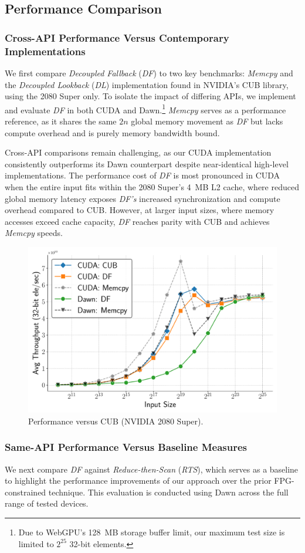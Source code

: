 \documentclass[acmsmall, manuscript, screen, review, anonymous]{acmart}
\begin{document}
\subsection{Performance Comparison}
\subsubsection{Cross-API Performance Versus Contemporary Implementations}
We first compare \emph{Decoupled Fallback} (\emph{DF}) to two key benchmarks: \emph{Memcpy}\textdagger{~\ref{sec:memcpy}} and the \emph{Decoupled Lookback} (\emph{DL}) implementation found in NVIDIA's CUB library, using the 2080 Super only. To isolate the impact of differing APIs, we implement and evaluate \emph{DF} in both CUDA and Dawn.\footnote{Due to WebGPU's 128~MB storage buffer limit, our maximum test size is limited to $2^{25}$ 32-bit elements.} \emph{Memcpy} serves as a performance reference, as it shares the same $2n$ global memory movement as \emph{DF} but lacks compute overhead and is purely memory bandwidth bound.

Cross-API comparisons remain challenging, as our CUDA implementation consistently outperforms its Dawn counterpart despite near-identical high-level implementations. The performance cost of \emph{DF} is most pronounced in CUDA when the entire input fits within the 2080 Super's 4~MB L2 cache, where reduced global memory latency exposes \emph{DF's} increased synchronization and compute overhead compared to CUB\@. However, at larger input sizes, where memory accesses exceed cache capacity, \emph{DF} reaches parity with CUB and achieves \emph{Memcpy} speeds.

\begin{figure}
  \centering
  \includegraphics[width=0.6\linewidth]{graphics/cuda_plot.pdf}
  \caption{Performance versus CUB (NVIDIA 2080 Super).}
\end{figure}

\subsubsection{Same-API Performance Versus Baseline Measures}
We next compare \emph{DF} against \emph{Reduce-then-Scan}\textdagger{~\ref{sec:rts}} (\emph{RTS}), which serves as a baseline to highlight the performance improvements of our approach over the prior FPG-constrained technique. This evaluation is conducted using Dawn across the full range of tested devices.
\end{document}
